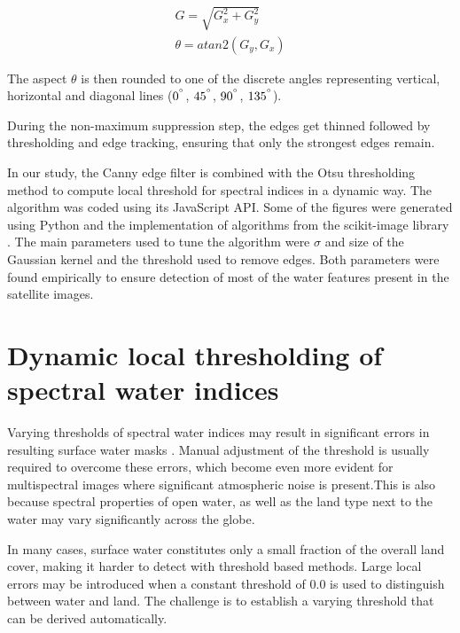 \begin{gather}
G = \sqrt{G_x^2 + G_y^2} \\
\theta = atan2\left(G_y, G_x\right)
\end{gather}

The aspect $\theta$ is then rounded to one of the discrete angles representing vertical, horizontal and diagonal lines ($0^{\degree}$, $45^{\degree}$, $90^{\degree}$, $135^{\degree}$).

During the non-maximum suppression step, the edges get thinned followed by thresholding and edge tracking, ensuring that only the strongest edges remain.

In our study, the Canny edge filter is combined with the Otsu thresholding method to compute local threshold for spectral indices in a dynamic way. The algorithm was coded using its JavaScript API. Some of the figures were generated using Python and the implementation of algorithms from the scikit-image library \citet{webScikitImage}. The main parameters used to tune the algorithm were $\sigma$ and size of the Gaussian kernel and the threshold used to remove edges. Both parameters were found empirically to ensure detection of most of the water features present in the satellite images.

\section{Dynamic local thresholding of spectral water indices}


Varying thresholds of spectral water indices may result in significant errors in resulting surface water masks \citet{Yang2014}. Manual adjustment of the threshold is usually required to overcome these errors, which become even more evident for multispectral images where significant atmospheric noise is present.This is also because spectral properties of open water, as well as the land type next to the water may vary significantly across the globe. 

In many cases, surface water constitutes only a small fraction of the overall land cover, making it harder to detect with threshold based methods. Large local errors may be introduced when a constant threshold of 0.0 is used to distinguish between water and land. The challenge is to establish a varying threshold that can be derived automatically. 


